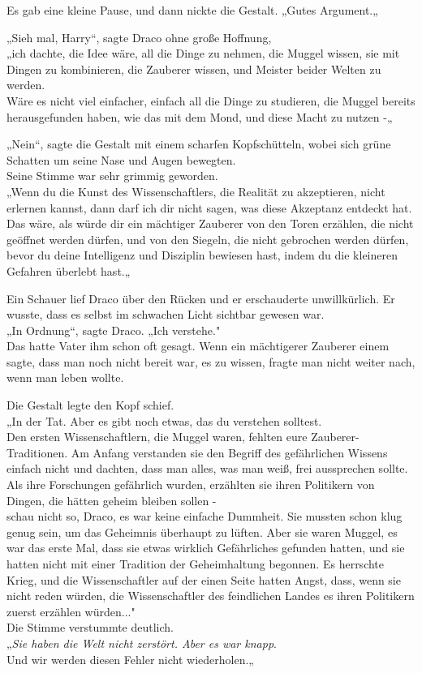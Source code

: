 {Es gab eine kleine Pause, und dann nickte die Gestalt. „Gutes Argument.„

„Sieh mal, Harry“, sagte Draco ohne große Hoffnung,\\ „ich dachte, die Idee wäre, all die Dinge zu nehmen, die Muggel wissen, sie mit Dingen zu kombinieren, die Zauberer wissen, und Meister beider Welten zu werden.\\ Wäre es nicht viel einfacher, einfach all die Dinge zu studieren, die Muggel bereits herausgefunden haben, wie das mit dem Mond, und diese Macht zu nutzen -„

„Nein“, sagte die Gestalt mit einem scharfen Kopfschütteln, wobei sich grüne Schatten um seine Nase und Augen bewegten.\\ Seine Stimme war sehr grimmig geworden.\\ „Wenn du die Kunst des Wissenschaftlers, die Realität zu akzeptieren, nicht erlernen kannst, dann darf ich dir nicht sagen, was diese Akzeptanz entdeckt hat.\\ Das wäre, als würde dir ein mächtiger Zauberer von den Toren erzählen, die nicht geöffnet werden dürfen, und von den Siegeln, die nicht gebrochen werden dürfen, bevor du deine Intelligenz und Disziplin bewiesen hast, indem du die kleineren Gefahren überlebt hast.„

Ein Schauer lief Draco über den Rücken und er erschauderte unwillkürlich. Er wusste, dass es selbst im schwachen Licht sichtbar gewesen war.\\ „In Ordnung“, sagte Draco. „Ich verstehe."\\ Das hatte Vater ihm schon oft gesagt. Wenn ein mächtigerer Zauberer einem sagte, dass man noch nicht bereit war, es zu wissen, fragte man nicht weiter nach, wenn man leben wollte.

Die Gestalt legte den Kopf schief.\\ „In der Tat. Aber es gibt noch etwas, das du verstehen solltest.\\ Den ersten Wissenschaftlern, die Muggel waren, fehlten eure Zauberer-Traditionen. Am Anfang verstanden sie den Begriff des gefährlichen Wissens einfach nicht und dachten, dass man alles, was man weiß, frei aussprechen sollte.\\ Als ihre Forschungen gefährlich wurden, erzählten sie ihren Politikern von Dingen, die hätten geheim bleiben sollen -\\ schau nicht so, Draco, es war keine einfache Dummheit. Sie mussten schon klug genug sein, um das Geheimnis überhaupt zu lüften. Aber sie waren Muggel, es war das erste Mal, dass sie etwas wirklich Gefährliches gefunden hatten, und sie hatten nicht mit einer Tradition der Geheimhaltung begonnen. Es herrschte Krieg, und die Wissenschaftler auf der einen Seite hatten Angst, dass, wenn sie nicht reden würden, die Wissenschaftler des feindlichen Landes es ihren Politikern zuerst erzählen würden..."\\ Die Stimme verstummte deutlich.\\ „\emph{Sie haben die Welt nicht zerstört. Aber es war knapp}.\\ Und wir werden diesen Fehler nicht wiederholen.„

}
